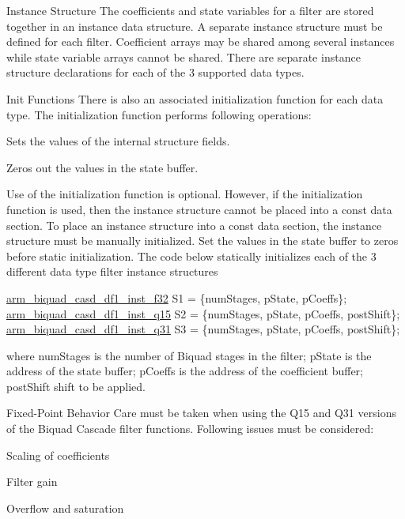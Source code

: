 \begin{DoxyParagraph}{Instance Structure }
The coefficients and state variables for a filter are stored together in an instance data structure. A separate instance structure must be defined for each filter. Coefficient arrays may be shared among several instances while state variable arrays cannot be shared. There are separate instance structure declarations for each of the 3 supported data types.
\end{DoxyParagraph}
\begin{DoxyParagraph}{Init Functions }
There is also an associated initialization function for each data type. The initialization function performs following operations\-:
\begin{DoxyItemize}
\item Sets the values of the internal structure fields.
\item Zeros out the values in the state buffer.
\end{DoxyItemize}
\end{DoxyParagraph}
\begin{DoxyParagraph}{}
Use of the initialization function is optional. However, if the initialization function is used, then the instance structure cannot be placed into a const data section. To place an instance structure into a const data section, the instance structure must be manually initialized. Set the values in the state buffer to zeros before static initialization. The code below statically initializes each of the 3 different data type filter instance structures 
\begin{DoxyPre}   
    \hyperlink{structarm__biquad__casd__df1__inst__f32}{arm\_biquad\_casd\_df1\_inst\_f32} S1 = \{numStages, pState, pCoeffs\};   
    \hyperlink{structarm__biquad__casd__df1__inst__q15}{arm\_biquad\_casd\_df1\_inst\_q15} S2 = \{numStages, pState, pCoeffs, postShift\};   
    \hyperlink{structarm__biquad__casd__df1__inst__q31}{arm\_biquad\_casd\_df1\_inst\_q31} S3 = \{numStages, pState, pCoeffs, postShift\};   
\end{DoxyPre}
 where {\ttfamily num\-Stages} is the number of Biquad stages in the filter; {\ttfamily p\-State} is the address of the state buffer; {\ttfamily p\-Coeffs} is the address of the coefficient buffer; {\ttfamily post\-Shift} shift to be applied.
\end{DoxyParagraph}
\begin{DoxyParagraph}{Fixed-\/\-Point Behavior }
Care must be taken when using the Q15 and Q31 versions of the Biquad Cascade filter functions. Following issues must be considered\-:
\begin{DoxyItemize}
\item Scaling of coefficients
\item Filter gain
\item Overflow and saturation
\end{DoxyItemize}
\end{DoxyParagraph}
